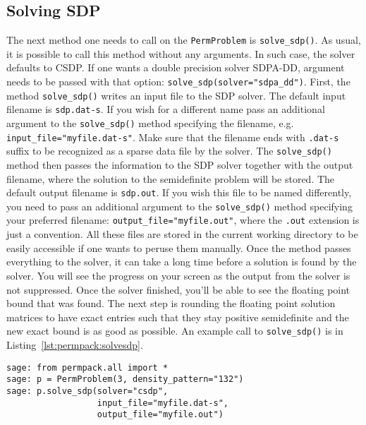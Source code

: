 \documentclass[12pt, a4paper, twoside]{report}
\begin{document}
\subsection{Solving SDP}
The next method one needs to call on the \texttt{PermProblem} is \texttt{solve\_sdp()}. As usual, it is possible to call this method without any arguments. In such case, the solver defaults to CSDP. If one wants a double precision solver SDPA-DD, argument needs to be passed with that option: \texttt{solve\_sdp(solver="sdpa\_dd")}. First, the method \texttt{solve\_sdp()} writes an input file to the SDP solver. The default input filename is \texttt{sdp.dat-s}. If you wish for a different name pass an additional argument to the \texttt{solve\_sdp()} method specifying the filename, e.g. \texttt{input\_file="myfile.dat-s"}. Make sure that the filename ends with \texttt{.dat-s} suffix to be recognized as a sparse data file by the solver. The \texttt{solve\_sdp()} method then passes the information to the SDP solver together with the output filename, where the solution to the semidefinite problem will be stored. The default output filename is \texttt{sdp.out}. If you wish this file to be named differently, you need to pass an additional argument to the \texttt{solve\_sdp()} method specifying your preferred filename: \texttt{output\_file="myfile.out"}, where the \texttt{.out} extension is just a convention. All these files are stored in the current working directory to be easily accessible if one wants to peruse them manually. Once the method passes everything to the solver, it can take a long time before a solution is found by the solver. You will see the progress on your screen as the output from the solver is not suppressed. Once the solver finished, you'll be able to see the floating point bound that was found. The next step is rounding the floating point solution matrices to have exact entries such that they stay positive semidefinite and the new exact bound is as good as possible. An example call to \texttt{solve\_sdp()} is in Listing~\ref{lst:permpack:solvesdp}.

 {}
\begin{lstlisting}
sage: from permpack.all import *
sage: p = PermProblem(3, density_pattern="132")
sage: p.solve_sdp(solver="csdp",
                  input_file="myfile.dat-s",
                  output_file="myfile.out")
\end{lstlisting}
\end{document}
